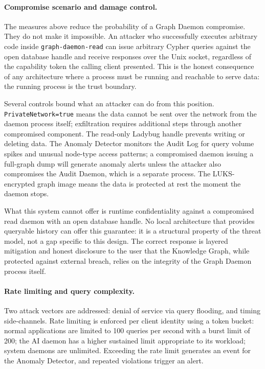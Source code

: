 \paragraph{Compromise scenario and damage control.}
\label{sec:graph-daemon-compromise}
The measures above reduce the probability of a Graph Daemon compromise. They
do not make it impossible. An attacker who successfully executes arbitrary code
inside \texttt{graph-daemon-read} can issue arbitrary Cypher queries against
the open database handle and receive responses over the Unix socket, regardless
of the capability token the calling client presented. This is the honest
consequence of any architecture where a process must be running and reachable to
serve data: the running process is the trust boundary.

Several controls bound what an attacker can do from this position.
\texttt{PrivateNetwork=true} means the data cannot be sent over the network
from the daemon process itself; exfiltration requires additional steps through
another compromised component. The read-only Ladybug handle prevents writing or
deleting data. The Anomaly Detector monitors the Audit Log for query volume
spikes and unusual node-type access patterns; a compromised daemon issuing a
full-graph dump will generate anomaly alerts unless the attacker also
compromises the Audit Daemon, which is a separate process. The LUKS-encrypted
graph image means the data is protected at rest the moment the daemon stops.

What this system cannot offer is runtime confidentiality against a compromised
read daemon with an open database handle. No local architecture that provides
queryable history can offer this guarantee: it is a structural property of the
threat model, not a gap specific to this design. The correct response is
layered mitigation and honest disclosure to the user that the Knowledge Graph,
while protected against external breach, relies on the integrity of the
Graph Daemon process itself.

\paragraph{Rate limiting and query complexity.}
Two attack vectors are addressed: denial of service via query flooding, and
timing side-channels. Rate limiting is enforced per client identity using a
token bucket: normal applications are limited to 100 queries per second with
a burst limit of 200; the AI daemon has a higher sustained limit appropriate
to its workload; system daemons are unlimited. Exceeding the rate limit
generates an event for the Anomaly Detector, and repeated violations trigger
an alert.

